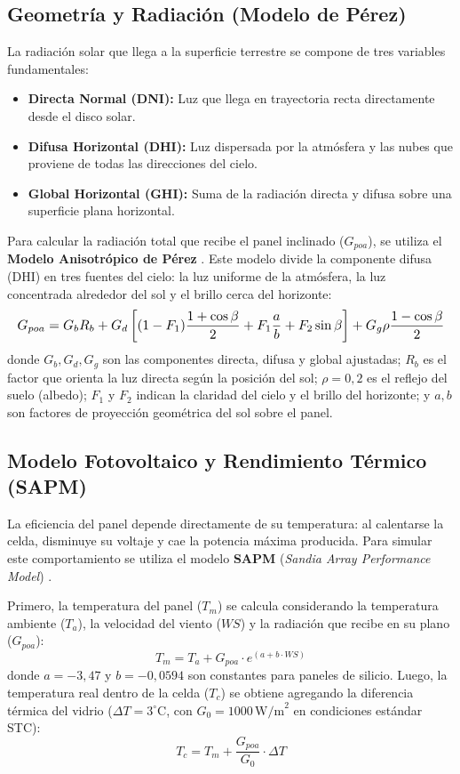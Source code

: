 \documentclass[12pt, a4paper, twocolumn]{article}
\begin{document}
\subsection{Geometría y Radiación (Modelo de Pérez)}
La radiación solar que llega a la superficie terrestre se compone de tres variables fundamentales:
\begin{itemize}
    \item \textbf{Directa Normal (DNI):} Luz que llega en trayectoria recta directamente desde el disco solar.
    \item \textbf{Difusa Horizontal (DHI):} Luz dispersada por la atmósfera y las nubes que proviene de todas las direcciones del cielo.
    \item \textbf{Global Horizontal (GHI):} Suma de la radiación directa y difusa sobre una superficie plana horizontal.
\end{itemize}

Para calcular la radiación total que recibe el panel inclinado ($G_{poa}$), se utiliza el \textbf{Modelo Anisotrópico de Pérez} \cite{perez1990new}. Este modelo divide la componente difusa (DHI) en tres fuentes del cielo: la luz uniforme de la atmósfera, la luz concentrada alrededor del sol y el brillo cerca del horizonte:
\begin{equation}
\resizebox{\linewidth}{!}{$\displaystyle
G_{poa} = G_b R_b + G_d \left[ (1-F_1) \frac{1+\cos\beta}{2} + F_1 \frac{a}{b} + F_2 \sin\beta \right] + G_g \rho \frac{1-\cos\beta}{2}
$}
\end{equation}
donde $G_b, G_d, G_g$ son las componentes directa, difusa y global ajustadas; $R_b$ es el factor que orienta la luz directa según la posición del sol; $\rho=0,2$ es el reflejo del suelo (albedo); $F_1$ y $F_2$ indican la claridad del cielo y el brillo del horizonte; y $a, b$ son factores de proyección geométrica del sol sobre el panel.
\subsection{Modelo Fotovoltaico y Rendimiento Térmico (SAPM)}
La eficiencia del panel depende directamente de su temperatura: al calentarse la celda, disminuye su voltaje y cae la potencia máxima producida. Para simular este comportamiento se utiliza el modelo \textbf{SAPM} (\textit{Sandia Array Performance Model}) \cite{king2004sandia}. 

Primero, la temperatura del panel ($T_m$) se calcula considerando la temperatura ambiente ($T_a$), la velocidad del viento ($WS$) y la radiación que recibe en su plano ($G_{poa}$):
\begin{equation}
T_m = T_a + G_{poa} \cdot e^{(a + b \cdot WS)}
\end{equation}
donde $a = -3,47$ y $b = -0,0594$ son constantes para paneles de silicio. Luego, la temperatura real dentro de la celda ($T_c$) se obtiene agregando la diferencia térmica del vidrio ($\Delta T = 3^\circ\text{C}$, con $G_0=1000\,\text{W/m}^2$ en condiciones estándar STC):
\begin{equation}
T_c = T_m + \frac{G_{poa}}{G_0} \cdot \Delta T
\end{equation}
\end{document}
